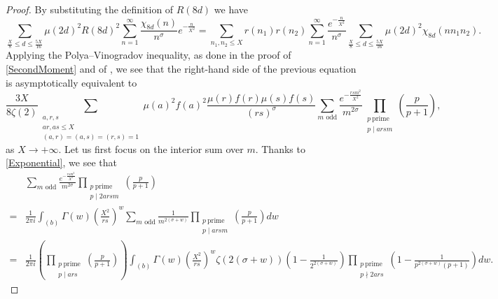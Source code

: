 \documentclass[10pt,a4paper]{amsart}
\theoremstyle{plain}
\theoremstyle{definition}
\theoremstyle{remark}
\begin{document}
\begin{proof}
By substituting the definition of $R(8d)$ we have
\[
\sum_{\frac{X}{8}\leq d\leq \frac{5X}{16}}\mu(2d)^2R(8d)^2\sum_{n=1}^{\infty}\frac{\chi_{8d}(n)}{n^\sigma} e^{-\frac{n}{X^2}} = \sum_{n_1,n_2\leq X}r(n_1)r(n_2)\sum_{n=1}^{\infty}\frac{e^{-\frac{n}{X^2}}}{n^{\sigma}}\sum_{\frac{X}{8}\leq d\leq \frac{5X}{16}}\mu(2d)^2\chi_{8d}(nn_1n_2).
\]
Applying the Polya--Vinogradov inequality, as done in the proof of \cref{SecondMoment} and of \cite[Lemma~3.2]{Soundararajan_2008}, we see that the right-hand side of the previous equation is asymptotically equivalent to
\begin{equation}\label{sum chi}
\frac{3X}{8\zeta(2)}\sum_{\substack{a,r,s\\ar,as\leq X\\(a,r)=(a,s)=(r,s)=1}}
\mu(a)^2f(a)^2\frac{\mu(r)f(r)\mu(s)f(s)}{(rs)^{\sigma}}\sum_{m \text{ odd}}\frac{e^{-\frac{rsm^2}{X^2}}}{m^{2\sigma}}\prod_{\substack{p \ \text{prime} \\ p\mid arsm}}\left(\frac{p}{p+1}\right),
\end{equation}
as $X \to +\infty$.
Let us first focus on the interior sum over $m$. Thanks to \eqref{Exponential}, we see that
\begin{equation}\label{integral}
\begin{aligned}
&\sum_{m \text{ odd}}\frac{e^{-\frac{rsm^2}{X^2}}}{m^{2\sigma}}\prod_{\substack{p \ \text{prime} \\ p\mid 2arsm}} \left(\frac{p}{p+1}\right) \\ = &\frac{1}{2\pi i} \int_{(b)}\Gamma(w)\left(\frac{X^2}{rs}\right)^{w}\sum_{m \text{ odd}}\frac{1}{m^{2(\sigma+w)}}\prod_{\substack{p \ \text{prime} \\ p\mid arsm}} \left(\frac{p}{p+1}\right)dw \\
= &\frac{1}{2\pi i} \left( \prod_{\substack{p \ \text{prime} \\ p\mid ars}} \left(\frac{p}{p+1}\right) \right) \int_{(b)}\Gamma(w)\left(\frac{X^2}{rs}\right)^{w} \zeta(2(\sigma+w))\left(1-\frac{1}{2^{2(\sigma+w)}}\right) \prod_{\substack{p \ \text{prime} \\ p\nmid 2ars}} \left(1-\frac{1}{p^{2(\sigma+w)}(p+1)}\right) dw.
\end{aligned}
\end{equation}


\end{proof}
\end{document}
